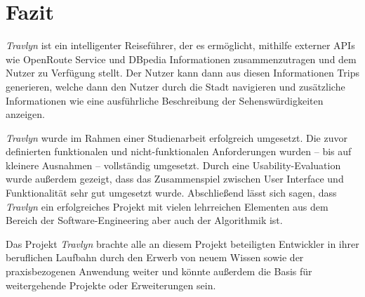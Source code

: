 \chapter{Fazit}

	\textit{Travlyn} ist ein intelligenter Reiseführer, der es ermöglicht, mithilfe externer \acs{API}s wie OpenRoute Service und DBpedia Informationen zusammenzutragen und dem Nutzer zu Verfügung stellt. Der Nutzer kann dann aus diesen Informationen Trips generieren, welche dann den Nutzer durch die Stadt navigieren und zusätzliche Informationen wie eine ausführliche Beschreibung der Sehenswürdigkeiten anzeigen. 
	
	\textit{Travlyn} wurde im Rahmen einer Studienarbeit erfolgreich umgesetzt. Die zuvor definierten funktionalen und nicht-funktionalen Anforderungen wurden -- bis auf kleinere Ausnahmen -- vollständig umgesetzt. Durch eine Usability-Evaluation wurde außerdem gezeigt, dass das Zusammenspiel zwischen User Interface und Funktionalität sehr gut umgesetzt wurde. Abschließend lässt sich sagen, dass \textit{Travlyn} ein erfolgreiches Projekt mit vielen lehrreichen Elementen aus dem Bereich der Software-Engineering aber auch der Algorithmik ist. 
	
	Das Projekt \textit{Travlyn} brachte alle an diesem Projekt beteiligten Entwickler in ihrer beruflichen Laufbahn durch den Erwerb von neuem Wissen sowie der praxisbezogenen Anwendung weiter und könnte außerdem die Basis für weitergehende Projekte oder Erweiterungen sein. 
